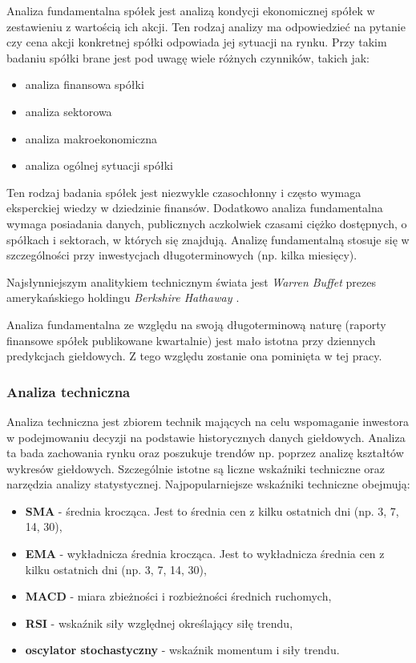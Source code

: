 \documentclass[a4paper, twoside, 11pt, openright]{article}
\begin{document}
Analiza fundamentalna spółek jest analizą kondycji ekonomicznej spółek w zestawieniu z wartością ich akcji. Ten rodzaj analizy ma odpowiedzieć na pytanie czy cena akcji konkretnej spółki odpowiada jej sytuacji na rynku. Przy takim badaniu spółki brane jest pod uwagę wiele różnych czynników, takich jak:
\begin{itemize}
\item{analiza finansowa spółki}
\item{analiza sektorowa}
\item{analiza makroekonomiczna}
\item{analiza ogólnej sytuacji spółki}
\end{itemize}

Ten rodzaj badania spółek jest niezwykle czasochłonny i często wymaga eksperckiej wiedzy w dziedzinie finansów. Dodatkowo analiza fundamentalna wymaga posiadania danych, publicznych aczkolwiek czasami ciężko dostępnych, o spółkach i sektorach, w których się znajdują. Analizę fundamentalną stosuje się w szczególności przy inwestycjach długoterminowych (np. kilka miesięcy).

Najsłynniejszym analitykiem technicznym świata jest \textit{Warren Buffet} prezes amerykańskiego holdingu \textit{Berkshire Hathaway \cite{berkeshire}}. 

\bigskip

Analiza fundamentalna ze względu na swoją długoterminową naturę (raporty finansowe spółek publikowane kwartalnie) jest mało istotna przy dziennych predykcjach giełdowych. Z tego względu zostanie ona pominięta w tej pracy.

\subsubsection{Analiza techniczna \cite{technicalanalysis}}

Analiza techniczna jest zbiorem technik mających na celu wspomaganie inwestora w podejmowaniu decyzji na podstawie historycznych danych giełdowych. Analiza ta bada zachowania rynku oraz poszukuje trendów np. poprzez analizę kształtów wykresów giełdowych. Szczególnie istotne są liczne wskaźniki techniczne oraz narzędzia analizy statystycznej.
Najpopularniejsze wskaźniki techniczne obejmują:
\begin{itemize}
\item{\textbf{SMA}} - średnia krocząca. Jest to średnia cen z kilku ostatnich dni (np. 3, 7, 14, 30),
\item{\textbf{EMA}} - wykładnicza średnia krocząca. Jest to wykładnicza średnia cen z kilku ostatnich dni (np. 3, 7, 14, 30),
\item{\textbf{MACD}} -  miara zbieżności i rozbieżności średnich ruchomych,
\item{\textbf{RSI}} -  wskaźnik siły względnej określający siłę trendu,
\item{\textbf{oscylator stochastyczny}} -  wskaźnik momentum i siły trendu.
\end{itemize}
\end{document}
